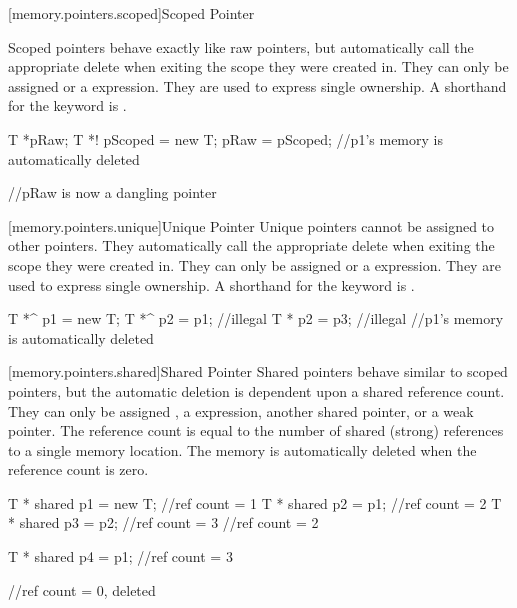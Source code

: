 [memory.pointers.scoped]{Scoped Pointer}

Scoped pointers behave exactly like raw pointers, but automatically call the appropriate delete when exiting the scope they were created in. They can only be assigned  or a  expression. They are used to express single ownership. A shorthand for the  keyword is \tcode{!}.

\begin{codeblock}

T *pRaw;
{
	T *! pScoped = new T;
	pRaw = pScoped;
} //p1's memory is automatically deleted

//pRaw is now a dangling pointer

\end{codeblock}

[memory.pointers.unique]{Unique Pointer}
Unique pointers cannot be assigned to other pointers. They automatically call the appropriate delete when exiting the scope they were created in. They can only be assigned  or a  expression. They are used to express single ownership. A shorthand for the  keyword is \tcode{\^}.


\begin{codeblock}
{
	T *^ p1 = new T;
	T *^ p2 = p1; //illegal
	T * p2 = p3; //illegal
} //p1's memory is automatically deleted

\end{codeblock}

[memory.pointers.shared]{Shared Pointer}
Shared pointers behave similar to scoped pointers, but the automatic deletion is dependent upon a shared reference count. They can only be assigned , a  expression, another shared pointer, or a weak pointer. The reference count is equal to the number of shared (strong) references to a single memory location. The memory is automatically deleted when the reference count is zero.

\begin{codeblock}

{
	T * shared p1 = new T;	//ref count = 1
	T * shared p2 = p1;		//ref count = 2
	{
		T * shared p3 = p2;	//ref count = 3
	} //ref count = 2

	T * shared p4 = p1;	//ref count = 3
} //ref count = 0, deleted

\end{codeblock}

